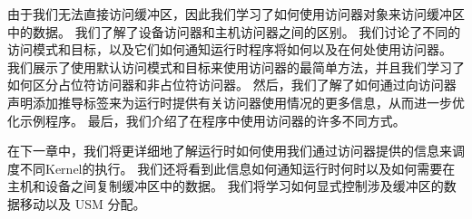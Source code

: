由于我们无法直接访问缓冲区，因此我们学习了如何使用访问器对象来访问缓冲区中的数据。 
我们了解了设备访问器和主机访问器之间的区别。 
我们讨论了不同的访问模式和目标，以及它们如何通知运行时程序将如何以及在何处使用访问器。 
我们展示了使用默认访问模式和目标来使用访问器的最简单方法，并且我们学习了如何区分占位符访问器和非占位符访问器。 
然后，我们了解了如何通过向访问器声明添加推导标签来为运行时提供有关访问器使用情况的更多信息，从而进一步优化示例程序。 
最后，我们介绍了在程序中使用访问器的许多不同方式。

在下一章中，我们将更详细地了解运行时如何使用我们通过访问器提供的信息来调度不同Kernel的执行。 
我们还将看到此信息如何通知运行时何时以及如何需要在主机和设备之间复制缓冲区中的数据。 
我们将学习如何显式控制涉及缓冲区的数据移动以及 USM 分配。